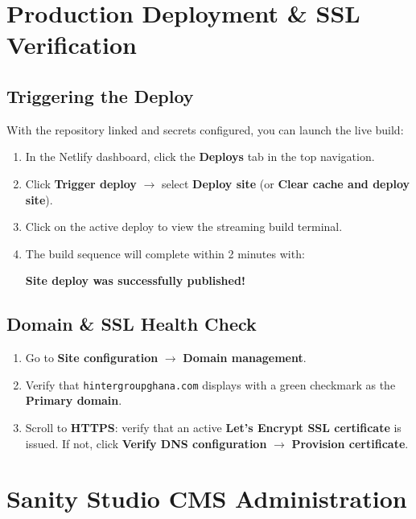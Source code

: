 \documentclass[11pt,a4paper,oneside]{book}
\begin{document}
\chapter{Production Deployment \& SSL Verification}

\section{Triggering the Deploy}
With the repository linked and secrets configured, you can launch the live build:
\begin{enumerate}
  \item In the Netlify dashboard, click the \textbf{Deploys} tab in the top navigation.
  \item Click \textbf{Trigger deploy} $\rightarrow$ select \textbf{Deploy site} (or \textbf{Clear cache and deploy site}).
  \item Click on the active deploy to view the streaming build terminal.
  \item The build sequence will complete within 2 minutes with:
    \begin{center}
      \bfseries\color{HGGGreen}Site deploy was successfully published!
    \end{center}
\end{enumerate}

\section{Domain \& SSL Health Check}
\begin{enumerate}
  \item Go to \textbf{Site configuration} $\rightarrow$ \textbf{Domain management}.
  \item Verify that \texttt{hintergroupghana.com} displays with a green checkmark as the \textbf{Primary domain}.
  \item Scroll to \textbf{HTTPS}: verify that an active \textbf{Let's Encrypt SSL certificate} is issued. If not, click \textbf{Verify DNS configuration} $\rightarrow$ \textbf{Provision certificate}.
\end{enumerate}

\chapter{Sanity Studio CMS Administration}
\label{chap:sanity}
\end{document}
